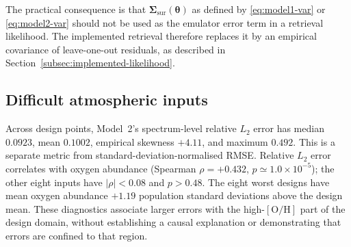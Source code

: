 \documentclass[12pt, letterpaper, oneside]{article}
\begin{document}
The practical consequence is that $\bm\Sigma_{\mathrm{sur}}(\bm\theta)$ as
defined by \eqref{eq:model1-var} or \eqref{eq:model2-var} should not be used
as the emulator error term in a retrieval likelihood. The implemented
retrieval therefore replaces it by an empirical covariance of leave-one-out
residuals, as described in Section~\ref{subsec:implemented-likelihood}.

\subsection{Difficult atmospheric inputs}

Across design points, Model~2's spectrum-level relative $L_2$ error has median
$0.0923$, mean $0.1002$, empirical skewness $+4.11$, and maximum $0.492$. This
is a separate metric from standard-deviation-normalised RMSE.
Relative $L_2$ error correlates with oxygen abundance (Spearman
$\rho=+0.432$, $p\simeq 1.0\times10^{-5}$); the other eight inputs have
$|\rho|<0.08$ and $p>0.48$. The eight worst designs have mean oxygen
abundance $+1.19$ population standard deviations above the design mean. These
diagnostics associate larger errors with the high-$[\mathrm{O/H}]$ part of the
design domain, without establishing a causal explanation or demonstrating that
errors are confined to that region.
\end{document}
